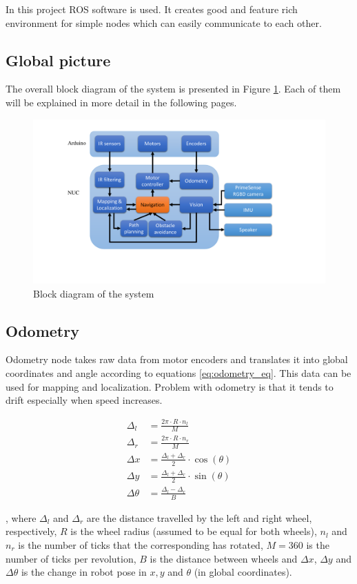 In this project ROS software is used. It creates good and feature rich environment for simple nodes which can easily communicate to each other.

\subsection{Global picture}
The overall block diagram of the system is presented in Figure \ref{fig:global}. Each of them will be explained in more detail in the following pages.
\begin{figure}[h]    
\centering    
                \includegraphics[trim = 0mm 40mm 60mm 0mm, clip, width=.7\textwidth]{figures/Global.pdf}
                \caption{Block diagram of the system}
                \label{fig:global}
\end{figure}
\subsection{Odometry}

Odometry node takes raw data from motor encoders and translates it into global coordinates and angle according to equations \ref{eq:odometry_eq}. This data can be used for mapping and localization. Problem with odometry is that it tends to drift especially when speed increases.

\label{eq:odometry_eq}
\begin{align}
\Delta_{l} &= \frac{2\pi \cdot R \cdot n_{l}}{M}  \\
\Delta_{r} &= \frac{2\pi \cdot R \cdot n_{r}}{M} \\
\Delta x &= \frac{\Delta_{l} + \Delta_{r}}{2} \cdot \cos(\theta) \\
\Delta y &= \frac{\Delta_{l} + \Delta_{r}}{2} \cdot \sin(\theta) \\
\Delta \theta &= \frac{\Delta_{l} - \Delta_{r}}{B}
\end{align}

, where $\Delta_l$ and $\Delta_r$ are the distance travelled by the left and right wheel, respectively, $R$ is the wheel radius (assumed to be equal for both wheels), $n_l$ and $n_r$ is the number of ticks that the corresponding has rotated, $M = 360$ is the number of ticks per revolution, $B$ is the distance between wheels and $\Delta x$, $\Delta y$ and $\Delta\theta$ is the change in robot pose in $x,y$ and $\theta$ (in global coordinates).




